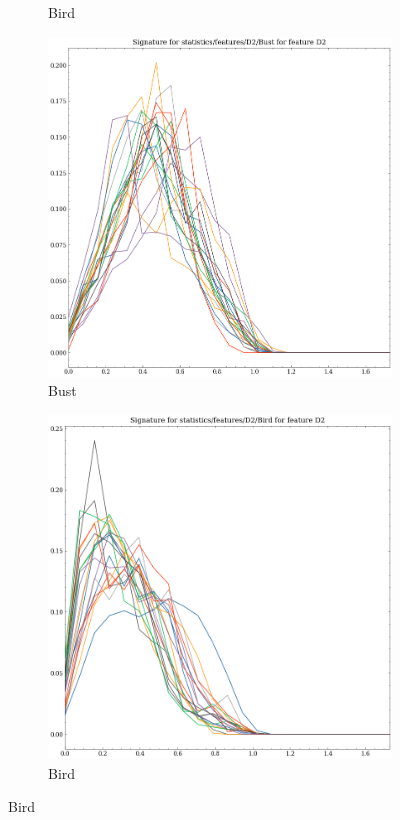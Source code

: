 \begin{figure}[t!p]
\begin{subfigure}[b]{0.23\textwidth}
        \caption{Bird}
    \end{subfigure}
    \hfill
    \begin{subfigure}[b]{0.23\textwidth}
        \includegraphics[width=\textwidth]{assets/feature_extraction/D2/Bust.png}
        \caption{Bust}
    \end{subfigure}
    \hfill
    \begin{subfigure}[b]{0.23\textwidth}
        \includegraphics[width=\textwidth]{assets/feature_extraction/D2/Bird.png}
        \caption{Bird}
        \label{fig:features-statistics-D2-h}    
    \end{subfigure}
    \hfill


\end{figure}
